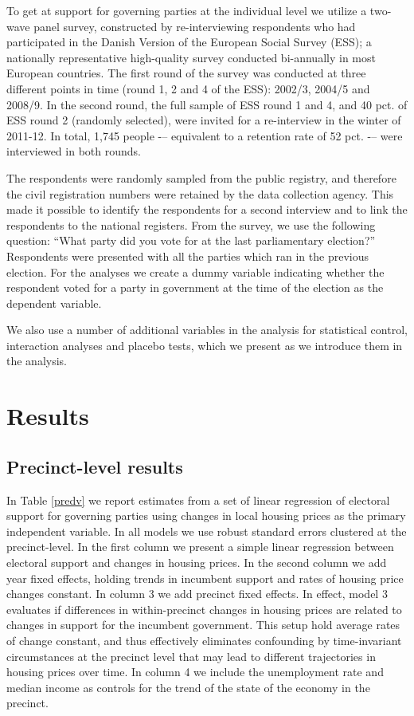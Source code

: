 \documentclass[12pt,a4paper]{article}
\begin{document}
	To get at support for governing parties at the individual level we utilize a two-wave panel survey, constructed by re-interviewing respondents who had participated in the Danish Version of the European Social Survey (ESS); a nationally representative high-quality survey conducted bi-annually in most European countries. The first round of the survey was conducted at three different points in time (round 1, 2 and 4 of the ESS): 2002/3, 2004/5 and 2008/9. In the second round, the full sample of ESS round 1 and 4, and 40 pct. of ESS round 2 (randomly selected), were invited for a re-interview in the winter of 2011-12. In total, 1,745 people -– equivalent to a retention rate of 52 pct. -– were interviewed in both rounds.
	
	The respondents were randomly sampled from the public registry, and therefore the civil registration numbers were retained by the data collection agency. This made it possible to identify the respondents for a second interview and to link the respondents to the national registers. From the survey, we use the following question: ``What party did you vote for at the last parliamentary election?'' Respondents were presented with all the parties which ran in the previous election. For the analyses we create a dummy variable indicating whether the respondent voted for a party in government at the time of the election as the dependent variable.
	
	We also use a number of additional variables in the analysis for statistical control, interaction analyses and placebo tests, which we present as we introduce them in the analysis. 
	
	
	\section{Results}
			
	\subsection{Precinct-level results}
	In Table \ref{predv} we report estimates from a set of linear regression of electoral support for governing parties using changes in local housing prices as the primary independent variable. In all models we use robust standard errors clustered at the precinct-level. In the first column we present a simple linear regression between electoral support and changes in housing prices. In the second column we add year fixed effects, holding trends in incumbent support and rates of housing price changes constant. In column 3 we add precinct fixed effects. In effect, model 3 evaluates if differences in within-precinct changes in housing prices are related to changes in support for the incumbent government. This setup hold average rates of change constant, and thus effectively eliminates confounding by time-invariant circumstances at the precinct level that may lead to different trajectories in housing prices over time. In column 4 we include the unemployment rate and median income as controls for the trend of the state of the economy in the precinct.
	
\end{document}
